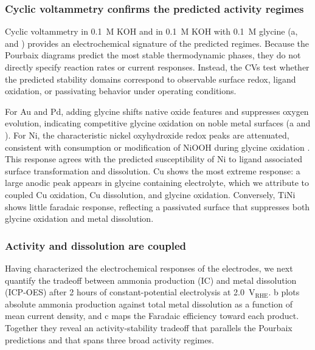 \documentclass[twoside,twocolumn,9pt]{article}
\begin{document}
\subsubsection{Cyclic voltammetry confirms the predicted activity regimes}

Cyclic voltammetry in 0.1~M KOH and in 0.1~M KOH with 0.1~M glycine (a, and ) provides an electrochemical signature of the predicted regimes. Because the Pourbaix diagrams predict the most stable thermodynamic phases, they do not directly specify reaction rates or current responses. Instead, the CVs test whether the predicted stability domains correspond to observable surface redox, ligand oxidation, or passivating behavior under operating conditions.

For Au and Pd, adding glycine shifts native oxide features and suppresses oxygen evolution, indicating competitive glycine oxidation on noble metal surfaces \cite{Chadderdon2014,Arulmani2019} (a and ). For Ni, the characteristic nickel oxyhydroxide redox peaks are attenuated, consistent with consumption or modification of NiOOH during glycine oxidation \cite{Boggs2009}. This response agrees with the predicted susceptibility of Ni to ligand associated surface transformation and dissolution. Cu shows the most extreme response: a large anodic peak appears in glycine containing electrolyte, which we attribute to coupled Cu oxidation, Cu dissolution, and glycine oxidation. Conversely, TiNi shows little faradaic response, reflecting a passivated surface that suppresses both glycine oxidation and metal dissolution.

\subsubsection{Activity and dissolution are coupled}

Having characterized the electrochemical responses of the electrodes, we next quantify the tradeoff between ammonia production (IC) and metal dissolution (ICP-OES) after 2 hours of constant-potential electrolysis at 2.0~V$_{\mathrm{RHE}}$. b plots absolute ammonia production against total metal dissolution as a function of mean current density, and c maps the Faradaic efficiency toward each product. Together they reveal an activity-stability tradeoff that parallels the Pourbaix predictions and that spans three broad activity regimes.
\end{document}
